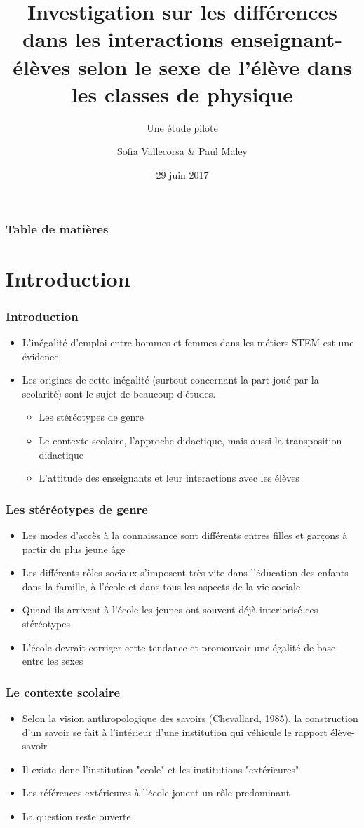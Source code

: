 \documentclass{beamer}
\title{Investigation sur les différences dans les interactions
  enseignant-élèves selon le sexe de l’élève dans les classes
  de physique}
\subtitle{Une étude pilote }
\author{Sofia Vallecorsa \& Paul Maley}
\date{29 juin 2017}
\begin{document}
\frame{\titlepage}

\begin{frame}
\frametitle{Table de matières}
\tableofcontents
\end{frame}

\section{Introduction}
\begin{frame}
\frametitle{Introduction}
\begin{itemize}
\item L'inégalité d'emploi entre hommes et femmes dans les métiers STEM est une évidence.
\item Les origines de cette inégalité (surtout concernant la part joué par la scolarité) sont le sujet de beaucoup d'études.
	\begin{itemize}
	\item Les stéréotypes de genre
	\item Le contexte scolaire, l'approche didactique, mais aussi la transposition didactique
	\item L'attitude des enseignants et leur interactions avec les élèves	
	\end{itemize}		 
\end{itemize}
\end{frame}

\begin{frame}
\frametitle{Les stéréotypes de genre}
\begin{itemize}
\item Les modes d’accès à la connaissance sont différents entres filles et garçons à partir du plus jeune âge
\item Les différents rôles sociaux s’imposent très vite dans l’éducation des enfants dans la famille, à l’école et dans tous les aspects de la vie sociale
\item Quand ils arrivent à l'école les jeunes ont souvent déjà interiorisé ces stéréotypes
\item L’école devrait corriger cette tendance et promouvoir une égalité de base entre les sexes
\end{itemize}
\end{frame}

\begin{frame}
\frametitle{Le contexte scolaire}
\begin{itemize}
	\item Selon la vision anthropologique des savoirs (Chevallard, 1985), la construction d’un savoir se fait à l’intérieur d’une institution qui véhicule le rapport élève-savoir
\item Il existe donc l'institution "ecole" et les institutions "extérieures"
\item Les références extérieures à l'école jouent un rôle predominant
\item La question reste ouverte
\end{itemize}
\end{frame}
\end{document}
